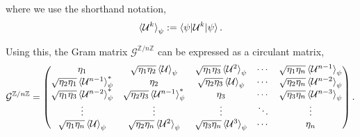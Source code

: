 \documentclass[12pt,letterpaper]{article}
\begin{document}
where we use the shorthand notation,
\begin{align*}
	\braket{\mathcal{U}^k}_\psi := \braket{\psi | \mathcal{U}^k | \psi}.
\end{align*}

Using this, the Gram matrix $\mathcal{G}^{\mathbb{Z}/n\mathbb{Z}}$ can be expressed as a circulant matrix,
\begin{align*}
	\mathcal{G}^{\mathbb{Z}/n\mathbb{Z}} = \begin{pmatrix}
 \eta_1 & \sqrt{\eta_1 \eta_2}\braket{\mathcal{U}}_{\psi} & \sqrt{\eta_1 \eta_3}\braket{\mathcal{U}^2}_{\psi} & \cdots & \sqrt{\eta_1 \eta_n}\braket{\mathcal{U}^{n-1}}_{\psi} \\
 \sqrt{\eta_2 \eta_1}\braket{\mathcal{U}^{n-1}}_{\psi}^* & \eta_2 & \sqrt{\eta_2 \eta_3}\braket{\mathcal{U}}_{\psi} & \cdots & \sqrt{\eta_2 \eta_n}\braket{\mathcal{U}^{n-2}}_{\psi} \\
 \sqrt{\eta_1 \eta_3}\braket{\mathcal{U}^{n-2}}_{\psi}^* & \sqrt{\eta_2 \eta_3}\braket{\mathcal{U}^{n-1}}_{\psi}^* & \eta_3 & \cdots & \sqrt{\eta_3 \eta_n}\braket{\mathcal{U}^{n-3}}_{\psi} \\
 \vdots & \vdots & \vdots & \ddots & \vdots \\
 \sqrt{\eta_1 \eta_n}\braket{\mathcal{U}}_{\psi} & \sqrt{\eta_2 \eta_n}\braket{\mathcal{U}^{2}}_{\psi} & \sqrt{\eta_3 \eta_n}\braket{\mathcal{U}^{3}}_{\psi} & \cdots & \eta_n
\end{pmatrix}.
\end{align*}
\end{document}
